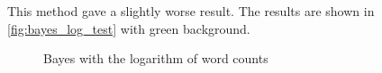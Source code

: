 This method gave a slightly worse result. The results are shown in \autoref{fig:bayes_log_test} with green background.

\begin{figure}[htpb]
    \caption{Bayes with the logarithm of word counts}
    \label{fig:bayes_log_test}
    \begin{tcolorbox}[colback=green!30!white,
            title=SVC - Word pairs]
        
    \end{tcolorbox}
\end{figure}